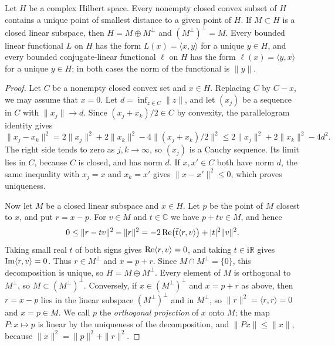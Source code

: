 \begin{proposition}\label{prop:hilbert-projection-representation}
Let $H$ be a complex Hilbert space. Every nonempty closed convex subset of $H$ contains a unique point of smallest distance to a given point of $H$. If $M\subset H$ is a closed linear subspace, then $H=M\oplus M^\perp$ and $(M^\perp)^\perp=M$. Every bounded linear functional $L$ on $H$ has the form $L(x)=\langle x,y\rangle$ for a unique $y\in H$, and every bounded conjugate-linear functional $\ell$ on $H$ has the form $\ell(x)=\langle y,x\rangle$ for a unique $y\in H$; in both cases the norm of the functional is $\|y\|$.
\end{proposition}
\begin{proof}
Let $C$ be a nonempty closed convex set and $x\in H$. Replacing $C$ by $C-x$, we may assume that $x=0$. Let $d=\inf_{z\in C}\|z\|$, and let $(x_j)$ be a sequence in $C$ with $\|x_j\|\to d$. Since $(x_j+x_k)/2\in C$ by convexity, the parallelogram identity gives
\[
 \|x_j-x_k\|^2=2\|x_j\|^2+2\|x_k\|^2
                  -4\|(x_j+x_k)/2\|^2
 \le2\|x_j\|^2+2\|x_k\|^2-4d^2.
\]
The right side tends to zero as $j,k\to\infty$, so $(x_j)$ is a Cauchy sequence. Its limit lies in $C$, because $C$ is closed, and has norm $d$. If $x,x'\in C$ both have norm $d$, the same inequality with $x_j=x$ and $x_k=x'$ gives $\|x-x'\|^2\le0$, which proves uniqueness.

Now let $M$ be a closed linear subspace and $x\in H$. Let $p$ be the point of $M$ closest to $x$, and put $r=x-p$. For $v\in M$ and $t\in\mathbb C$ we have $p+tv\in M$, and hence
\[
 0\le\|r-tv\|^2-\|r\|^2=-2\operatorname{Re}\bigl(\bar t\langle r,v\rangle\bigr)+|t|^2\|v\|^2.
\]
Taking small real $t$ of both signs gives $\operatorname{Re}\langle r,v\rangle=0$, and taking $t\in\mathrm i\mathbb R$ gives $\operatorname{Im}\langle r,v\rangle=0$. Thus $r\in M^\perp$ and $x=p+r$. Since $M\cap M^\perp=\{0\}$, this decomposition is unique, so $H=M\oplus M^\perp$. Every element of $M$ is orthogonal to $M^\perp$, so $M\subset(M^\perp)^\perp$. Conversely, if $x\in(M^\perp)^\perp$ and $x=p+r$ as above, then $r=x-p$ lies in the linear subspace $(M^\perp)^\perp$ and in $M^\perp$, so $\|r\|^2=\langle r,r\rangle=0$ and $x=p\in M$. We call $p$ the \emph{orthogonal projection} of $x$ onto $M$; the map $P\colon x\mapsto p$ is linear by the uniqueness of the decomposition, and $\|Px\|\le\|x\|$, because $\|x\|^2=\|p\|^2+\|r\|^2$.


\end{proof}
